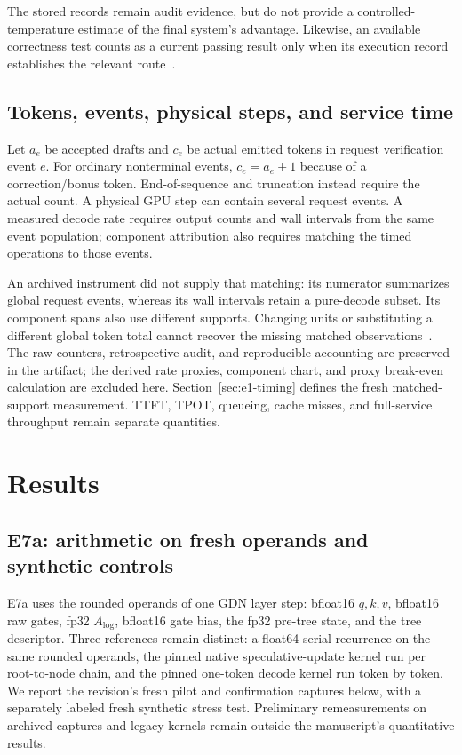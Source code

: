 \documentclass[conference]{IEEEtran}
\begin{document}
The stored records remain audit evidence, but do not provide a controlled-temperature estimate of the final system's advantage. Likewise, an available correctness test counts as a current passing result only when its execution record establishes the relevant route~\cite{lumo2026archive}.

\subsection{Tokens, events, physical steps, and service time}
Let $a_e$ be accepted drafts and $c_e$ be actual emitted tokens in request verification event $e$. For ordinary nonterminal events, $c_e=a_e+1$ because of a correction/bonus token. End-of-sequence and truncation instead require the actual count. A physical GPU step can contain several request events. A measured decode rate requires output counts and wall intervals from the same event population; component attribution also requires matching the timed operations to those events.

An archived instrument did not supply that matching: its numerator summarizes global request events, whereas its wall intervals retain a pure-decode subset. Its component spans also use different supports. Changing units or substituting a different global token total cannot recover the missing matched observations~\cite{lumo2026archive}. The raw counters, retrospective audit, and reproducible accounting are preserved in the artifact; the derived rate proxies, component chart, and proxy break-even calculation are excluded here. Section~\ref{sec:e1-timing} defines the fresh matched-support measurement. TTFT, TPOT, queueing, cache misses, and full-service throughput remain separate quantities.

\section{Results}
\label{sec:results}
\subsection{E7a: arithmetic on fresh operands and synthetic controls}
\label{sec:e7a-pilot}
E7a uses the rounded operands of one GDN layer step: bfloat16 $q,k,v$, bfloat16 raw gates, fp32 $A_{\log}$, bfloat16 gate bias, the fp32 pre-tree state, and the tree descriptor. Three references remain distinct: a float64 serial recurrence on the same rounded operands, the pinned native speculative-update kernel run per root-to-node chain, and the pinned one-token decode kernel run token by token. We report the revision's fresh pilot and confirmation captures below, with a separately labeled fresh synthetic stress test. Preliminary remeasurements on archived captures and legacy kernels remain outside the manuscript's quantitative results.
\end{document}
